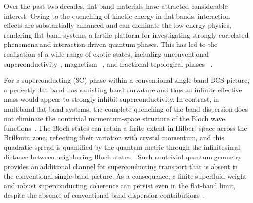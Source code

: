 \documentclass[
  prb,
  reprint,
  superscriptaddress,
  amsmath,
  amssymb,
  longbibliography
]{revtex4-2}
\begin{document}
Over the past two decades, flat-band materials have attracted considerable interest. Owing to the quenching of kinetic energy in flat bands, interaction effects are substantially enhanced and can dominate the low-energy physics, rendering flat-band systems a fertile platform for investigating strongly correlated phenomena and interaction-driven quantum phases. This has led to the realization of a wide range of exotic states, including unconventional superconductivity~\cite{caoUnconventionalSuperconductivityMagicangle2018,peottaSuperfluidityTopologicallyNontrivial2015a,yankowitzTuningSuperconductivityTwisted2019},  magnetism ~\cite{repellinFerromagnetismNarrowBands2020,linFlatbandsEmergentFerromagnetic2018}, and fractional topological phases ~\cite{tangHighTemperatureFractionalQuantum2011,regnaultFractionalChernInsulator2011,royBandGeometryFractional2014}. 

For a superconducting (SC) phase within a conventional single-band BCS picture, a perfectly flat band has vanishing band curvature and thus an infinite effective mass would appear to strongly inhibit superconductivity. In contrast, in multiband flat-band systems, the complete quenching of the band dispersion does not eliminate the nontrivial momentum-space structure of the Bloch wave functions~\cite{huhtinenRevisitingFlatBand2022,tormaQuantumMetricEffective2018a,huGeometricConventionalContributions2025,tovmasyanEffectiveTheoryEmergent2016a}. The Bloch states can retain a finite extent in Hilbert space across the Brillouin zone, reflecting their variation with crystal momentum, and this quadratic spread is quantified by the quantum metric through the infinitesimal distance between neighboring Bloch states~\cite{restaInsulatingStateMatter2011,chengQuantumGeometricTensor2010,yuQuantumGeometryQuantum2025}. Such nontrivial quantum geometry provides an additional channel for superconducting transport that is absent in the conventional single-band picture. As a consequence, a finite superfluid weight and robust superconducting coherence can persist even in the flat-band limit, despite the absence of conventional band-dispersion contributions~\cite{peottaSuperfluidityTopologicallyNontrivial2015a,xieTopologyBoundedSuperfluidWeight2020a,tormaSuperconductivitySuperfluidityQuantum2022a,julkuGeometricOriginSuperfluidity2016a}.
\end{document}
